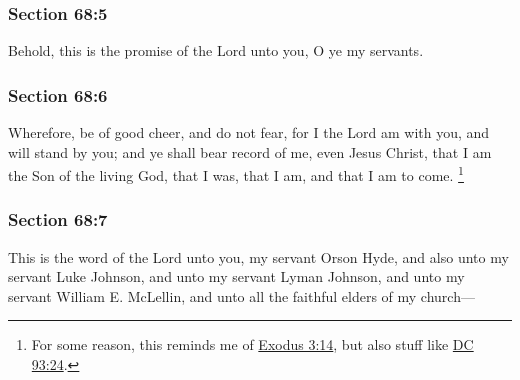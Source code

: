 	\subsubsection{Section 68:5} %
		\label{DC68-5}

		Behold, this is the promise of the Lord unto you, O ye my servants.


	\subsubsection{Section 68:6} %
		\label{DC68-6}

		Wherefore, be of good cheer, and do not fear, for I the Lord am with you, and will stand by you; and ye shall bear record of me, even Jesus Christ, that I am the Son of the living God, that I was, that I am, and that I am to come.%
			\footnote{%
				For some reason, this reminds me of \hyperref[EXODUS-3-14]{Exodus 3:14}, but also stuff like \hyperref[DC93-24]{DC 93:24}.
				}


	\subsubsection{Section 68:7} %
		\label{DC68-7}

		This is the word of the Lord unto you, my servant Orson Hyde, and also unto my servant Luke Johnson, and unto my servant Lyman Johnson, and unto my servant William E. McLellin, and unto all the faithful elders of my church---


